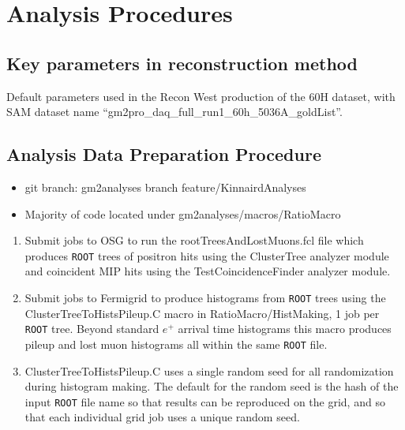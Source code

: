 
\graphicspath{{Figures/CBO/Frequency/}{Figures/VW/}}

\chapter{Analysis Procedures}
\label{Ch:Procedures}


\section{Key parameters in reconstruction method}

	Default parameters used in the Recon West production of the 60H dataset, with SAM dataset name ``gm2pro\_daq\_full\_run1\_60h\_5036A\_goldList''.

\section{Analysis Data Preparation Procedure}

	\begin{itemize}
		\item{git branch: gm2analyses branch feature/KinnairdAnalyses}
		\item{Majority of code located under gm2analyses/macros/RatioMacro}
	\end{itemize}

	\begin{enumerate}
		\item{Submit jobs to OSG to run the rootTreesAndLostMuons.fcl file which produces \texttt{ROOT} trees of positron hits using the ClusterTree analyzer module and coincident MIP hits using the TestCoincidenceFinder analyzer module.}
		\item{Submit jobs to Fermigrid to produce histograms from \texttt{ROOT} trees using the ClusterTreeToHistsPileup.C macro in RatioMacro/HistMaking, 1 job per \texttt{ROOT} tree. Beyond standard $e^{+}$ arrival time histograms this macro produces pileup and lost muon histograms all within the same \texttt{ROOT} file.}
		\item{ClusterTreeToHistsPileup.C uses a single random seed for all randomization during histogram making. The default for the random seed is the hash of the input \texttt{ROOT} file name so that results can be reproduced on the grid, and so that each individual grid job uses a unique random seed.}
	\end{enumerate}


